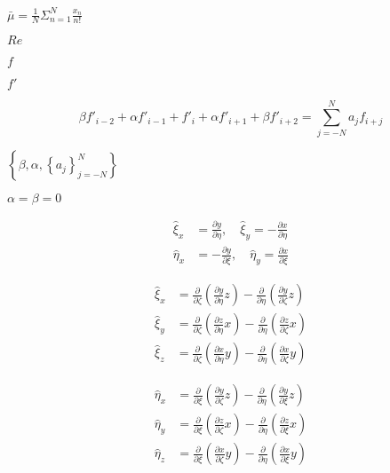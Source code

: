 \documentclass{article}
\begin{document}
$\bar{\mu} = \frac{1}{N}\Sigma_{n=1}^{N}\frac{x_n}{n!}$
\pagebreak

$\ensuremath{\mathit{Re}}$
\pagebreak

$f$
\pagebreak

$f'$
\pagebreak

\[ \beta f'_{i-2} + \alpha f'_{i-1} + f'_i + \alpha f'_{i+1} + \beta f'_{i+2} = \sum_{j=-N}^N a_j f_{i+j} \]
\pagebreak

$\left\{\beta, \alpha, \left\{a_j\right\}_{j=-N}^N\right\}$
\pagebreak

$\alpha = \beta = 0$
\pagebreak

\[ \begin{aligned} \hat{\xi}_x &= \frac{\partial y}{\partial \eta}, \quad \hat{\xi}_y = -\frac{\partial x}{\partial \eta} \\ \hat{\eta}_x &= -\frac{\partial y}{\partial \xi}, \quad \hat{\eta}_y = \frac{\partial x}{\partial \xi} \end{aligned} \]
\pagebreak

\[ \begin{aligned} \hat{\xi}_x &= \frac{\partial}{\partial \zeta}\left(\frac{\partial y}{\partial \eta}z\right) - \frac{\partial}{\partial \eta}\left(\frac{\partial y}{\partial \zeta}z\right) \\ \hat{\xi}_y &= \frac{\partial}{\partial \zeta}\left(\frac{\partial z}{\partial \eta}x\right) - \frac{\partial}{\partial \eta}\left(\frac{\partial z}{\partial \zeta}x\right) \\ \hat{\xi}_z &= \frac{\partial}{\partial \zeta}\left(\frac{\partial x}{\partial \eta}y\right) - \frac{\partial}{\partial \eta}\left(\frac{\partial x}{\partial \zeta}y\right) \end{aligned} \]
\pagebreak

\[ \begin{aligned} \hat{\eta}_x &= \frac{\partial}{\partial \xi}\left(\frac{\partial y}{\partial \zeta}z\right) - \frac{\partial}{\partial \eta}\left(\frac{\partial y}{\partial \xi}z\right) \\ \hat{\eta}_y &= \frac{\partial}{\partial \xi}\left(\frac{\partial z}{\partial \zeta}x\right) - \frac{\partial}{\partial \eta}\left(\frac{\partial z}{\partial \xi}x\right) \\ \hat{\eta}_z &= \frac{\partial}{\partial \xi}\left(\frac{\partial x}{\partial \zeta}y\right) - \frac{\partial}{\partial \eta}\left(\frac{\partial x}{\partial \xi}y\right) \end{aligned} \]
\pagebreak
\end{document}
